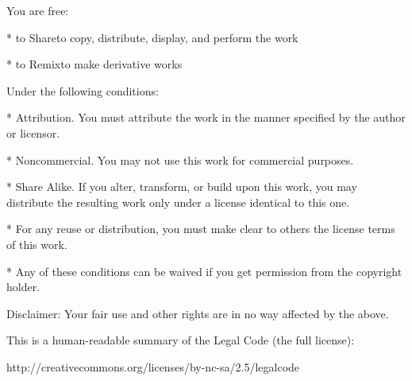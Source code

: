 You are free:

* to Share{\dash}to copy, distribute, display, and perform the work

* to Remix{\dash}to make derivative works

Under the following conditions:

* Attribution. You must attribute the work in the manner specified
by the author or licensor.

* Noncommercial. You may not use this work for commercial
purposes.

* Share Alike. If you alter, transform, or build upon this work,
you may distribute the resulting work only under a license
identical to this one.



* For any reuse or distribution, you must make clear to others the
license terms of this work.

* Any of these conditions can be waived if you get permission from
the copyright holder.

Disclaimer: Your fair use and other rights are in no way affected
by the above.

This is a human-readable summary of the Legal Code (the full
license):

http://creativecommons.org/licenses/by-nc-sa/2.5/legalcode


